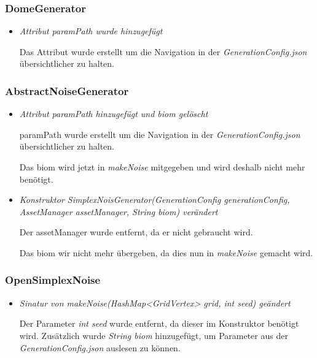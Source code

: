 \subsubsection{DomeGenerator}
\begin{itemize}
    \item \textit{Attribut paramPath wurde hinzugefügt}
        \begin{leftbar}[0.9\linewidth]
            Das Attribut wurde erstellt um die Navigation in der \textit{GenerationConfig.json} übersichtlicher zu halten.
        \end{leftbar}
\end{itemize}

\subsubsection{AbstractNoiseGenerator}
\begin{itemize}
    \item \textit{Attribut paramPath hinzugefügt und biom gelöscht}
    \begin{leftbar}[0.9\linewidth]
            paramPath wurde erstellt um die Navigation in der \textit{GenerationConfig.json} übersichtlicher zu halten.\par
            
            Das biom wird jetzt in \textit{makeNoise} mitgegeben und wird deshalb nicht mehr benötigt.
        \end{leftbar}
    
        \item \textit{Konstruktor SimplexNoisGenerator(GenerationConfig generationConfig, AssetManager assetManager, String biom) verändert}
        \begin{leftbar}[0.9\linewidth]
            Der assetManager wurde entfernt, da er nicht gebraucht wird.\par
            
            Das biom wir nicht mehr übergeben, da dies nun in \textit{makeNoise} gemacht wird.
        \end{leftbar}
    \end{itemize}
    
\subsubsection{OpenSimplexNoise}
\begin{itemize}
    \item \textit{Sinatur von  makeNoise(HashMap<GridVertex> grid, int seed) geändert}
        \begin{leftbar}[0.9\linewidth]
            Der Parameter \textit{int seed} wurde entfernt, da dieser im Konstruktor benötigt wird.
            Zusätzlich wurde \textit{String biom} hinzugefügt, um Parameter aus der \textit{GenerationConfig.json}
            auslesen zu können.
        \end{leftbar}
\end{itemize}
    
